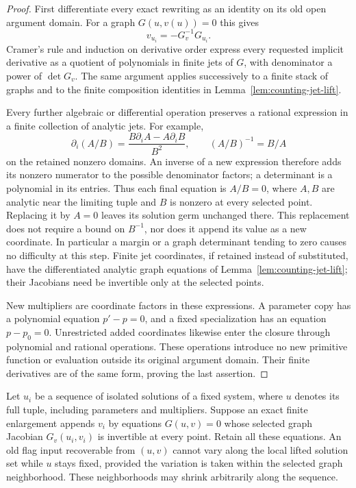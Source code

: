 \begin{proof}
First differentiate every exact rewriting as an identity on its old
open argument domain.  For a graph $G(u,v(u))=0$ this gives
\[
 v_{u_i}=-G_v^{-1}G_{u_i}.
\]
Cramer's rule and induction on derivative order express every requested
implicit derivative as a quotient of polynomials in finite jets of
$G$, with denominator a power of $\det G_v$.  The same argument
applies successively to a finite stack of graphs and to the finite
composition identities in Lemma~\ref{lem:counting-jet-lift}.

Every further algebraic or differential operation preserves a rational
expression in a finite collection of analytic jets.  For example,
\[
 \partial_i(A/B)
   =\frac{B\partial_iA-A\partial_iB}{B^2},
 \qquad (A/B)^{-1}=B/A
\]
on the retained nonzero domains.  An inverse of a new expression
therefore adds its nonzero numerator to the possible denominator
factors; a determinant is a polynomial in its entries.  Thus each
final equation is $A/B=0$, where $A,B$ are analytic near the limiting
tuple and $B$ is nonzero at every selected point.  Replacing it by
$A=0$ leaves its solution germ unchanged there.  This replacement
does not require a bound on $B^{-1}$, nor does it append its value
as a new coordinate.  In particular a margin or a graph determinant
tending to zero causes no difficulty at this step.  Finite jet
coordinates, if retained instead of substituted, have the
differentiated analytic graph equations of
Lemma~\ref{lem:counting-jet-lift}; their Jacobians need be invertible
only at the selected points.

New multipliers are coordinate factors in these expressions.  A
parameter copy has a polynomial equation $p'-p=0$, and a fixed
specialization has an equation $p-p_0=0$.  Unrestricted added
coordinates likewise enter the closure through polynomial and
rational operations.  These operations introduce no new primitive
function or evaluation outside its original argument domain.  Their
finite derivatives are of the same form, proving the last assertion.
\end{proof}

\begin{lemma}
\label{lem:counting-graph-recovery}
Let $u_i$ be a sequence of isolated solutions of a fixed system,
where $u$ denotes its full tuple, including parameters and multipliers.
Suppose an exact finite enlargement appends $v_i$ by equations
$G(u,v)=0$ whose selected graph Jacobian $G_v(u_i,v_i)$ is invertible
at every point.  Retain all these equations.  An old flag input
recoverable from $(u,v)$ cannot vary along the local lifted solution
set while $u$ stays fixed, provided the variation is taken within the
selected graph neighborhood.  These neighborhoods may shrink
arbitrarily along the sequence.
\end{lemma}

